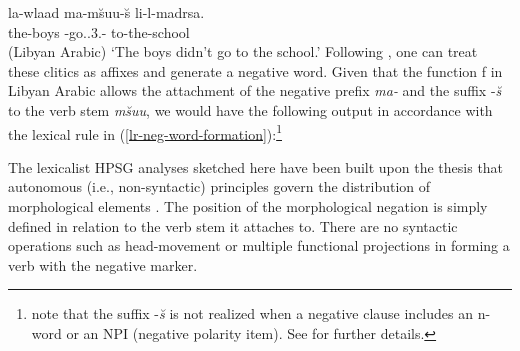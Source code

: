 \documentclass[output=paper,biblatex,babelshorthands,newtxmath,draftmode,colorlinks,citecolor=brown]{langscibook}
\begin{document}
\begin{exe}
\begin{xlist}
\begin{exe}
\begin{xlist}
\ea
\gll la-wlaad ma-m\u{s}uu-\u{s} li-l-madrsa. \\
     the-boys \NEG-go.\pst.3.\pl-\NEG{} to-the-school\\\hfill(Libyan Arabic)
\glt `The boys didn't go to the school.'
\z
%
\largerpage[2]
Following \citet[]{BK:12}, one can treat these clitics as affixes and generate
a negative word. Given that the function f in Libyan Arabic allows
the attachment of the negative prefix \textit{ma-} and the suffix -\textit{\u{s}} to the verb
stem \emph{m\u{s}uu}, we would have the following output in accordance
with the lexical rule in (\ref{lr-neg-word-formation}):\footnote{%
   \citet{BK:12} note that the suffix -\textit{\u{s}} is not realized when a negative clause
   includes an n-word or an NPI (negative polarity item). See \citet{BK:12} for further details.}
%
%


\ea
\z

The lexicalist HPSG analyses sketched here have been built upon the
thesis that autonomous (i.e., non-syntactic) principles govern the
distribution of morphological elements \citep{BM:95}.
The position of the morphological negation is simply
defined in relation to
the verb stem it attaches to. There are no syntactic operations such
as head-movement or multiple functional projections in forming
a verb with the negative marker.




\end{xlist}
\end{exe}
\end{xlist}
\end{exe}
\end{document}
